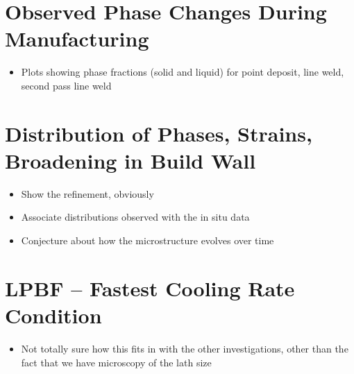 \documentclass{revtex4-1}
\begin{document}
\section{Observed Phase Changes During Manufacturing}
\begin{itemize}
	\item Plots showing phase fractions (solid and liquid) for point deposit, line weld, second pass line weld
\end{itemize}

\section{Distribution of Phases, Strains, Broadening in Build Wall}
\begin{itemize}
	\item Show the refinement, obviously
	\item Associate distributions observed with the in situ data
	\item Conjecture about how the microstructure evolves over time
\end{itemize}

\section{LPBF -- Fastest Cooling Rate Condition}
\begin{itemize}
	\item Not totally sure how this fits in with the other investigations, other than the fact that we have microscopy of the lath size
\end{itemize}
\end{document}
